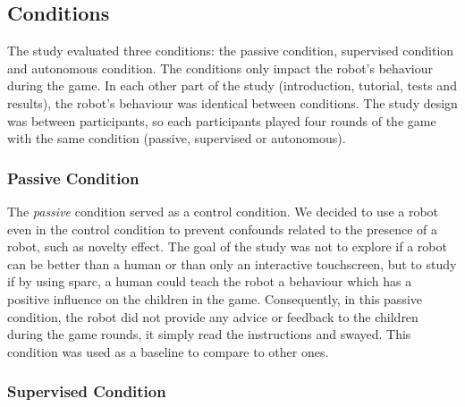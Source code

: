 \subsection{Conditions}
The study evaluated three conditions: the passive condition, supervised condition and autonomous condition. The conditions only impact the robot's behaviour during the game. In each other part of the study (introduction, tutorial, tests and results), the robot's behaviour was identical between conditions.
The study design was between participants, so each participants played four rounds of the game with the same condition (passive, supervised or autonomous).  %

\subsubsection{Passive Condition}

The \textit{passive} condition served as a control condition. We decided to use a robot even in the control condition to prevent confounds related to the presence of a robot, such as novelty effect. The goal of the study was not to explore if a robot can be better than a human or than only an interactive touchscreen, but to study if by using \gls{sparc}, a human could teach the robot a behaviour which has a positive influence on the children in the game. Consequently, in this passive condition, the robot did not provide any advice or feedback to the children during the game rounds, it simply read the instructions and swayed. This condition was used as a baseline to compare to other ones.




\subsubsection{Supervised Condition}

